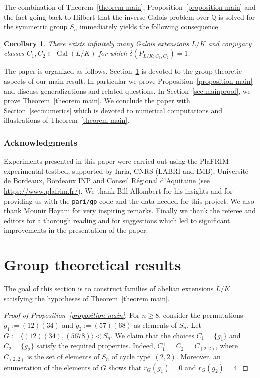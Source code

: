 \documentclass[JEP,XML,SOM,Unicode,NoEqCountersInSection,NoFloatCountersInSection,published]{cedram}
\newtheorem{corollary}[X]{Corollary}
\theoremstyle{definition}
\DeclareMathOperator{\Gal}{Gal}
\newcommand{\Q}{\mathbb Q}
\begin{document}
The combination of Theorem~\ref{theorem main}, Proposition~\ref{proposition main} and the fact going back to Hilbert that the inverse Galois problem over $\Q$ is solved for the symmetric group $S_n$ immediately yields the following consequence.

\begin{corollary}\label{cor}
There exists infinitely many Galois extensions $L/K$ and conjugacy classes $C_1,C_2 \subset \Gal(L/K)$ for which $\delta(P_{L/K;C_1,C_2})=1$.
\end{corollary}

The paper is organized as follows. Section~\ref{sec:groups} is devoted to the group theoretic aspects of our main result. In particular we prove Proposition~\ref{proposition main} and discuss generalizations and related questions. In Section~\ref{sec:mainproof}, we prove Theorem~\ref{theorem main}. We conclude the paper with Section~\ref{sec:numerics} which is devoted to numerical computations and illustrations of Theorem~\ref{theorem main}.

\subsubsection*{Acknowledgments}
Experiments presented in this paper were carried out using the PlaFRIM experimental testbed, supported by Inria, CNRS (LABRI and IMB), Université de Bordeaux, Bordeaux INP and Conseil Régional d'Aquitaine (see \url{https://www.plafrim.fr/}). We thank Bill Allombert for his insights and for providing us with the {\tt pari/gp} code and the data needed for this project. We also thank Mounir Hayani for very inspiring remarks. Finally we thank the referee and editors for a thorough reading and for suggestions which led to significant improvements in the presentation of the paper.

\section{Group theoretical results}\label{sec:groups}

The goal of this section is to construct families of abelian extensions $L/K$ satisfying the hypotheses of Theorem~\ref{theorem main}.

\begin{proof}[Proof of Proposition~\ref{proposition main}]
For $n\geq 8$, consider the permutations $g_1:=(12)(34)$ and $g_2:=(57)(68)$ as elements of $S_n$. Let $G:= \langle (12)(34),(5678) \rangle < S_n$. We claim that the choices $C_1=\{g_1\}$ and $C_2=\{g_2\}$ satisfy the required properties. Indeed,
$ C_1^+ = C_2^+=C_{(2,2)} $, where $C_{(2,2)}$ is the set of elements of $S_n$ of cycle type~$(2,2)$. Moreover, an enumeration of the elements of $G$ shows that $r_G(g_1)=0$ and \hbox{$r_G(g_2)=4$}.
\end{proof}
\end{document}
